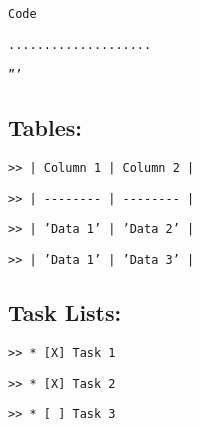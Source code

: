 \documentclass[12pt,british]{article}
\begin{document}
\noindent \texttt{\qquad{}Code }

\noindent \texttt{\qquad{}....................}

\noindent \texttt{\qquad{}'''}

\subsection{Tables:}

\noindent \texttt{>\textcompwordmark > | Column 1 | Column 2 |}

\noindent \texttt{>\textcompwordmark > | -{}-{}-{}-{}-{}-{}-{}- |
-{}-{}-{}-{}-{}-{}-{}- |}

\noindent \texttt{>\textcompwordmark > | 'Data 1' | 'Data 2' |}

\noindent \texttt{>\textcompwordmark > | 'Data 1' | 'Data 3' |}

\subsection{Task Lists:}

\noindent \texttt{>\textcompwordmark > {*} {[}X{]} Task 1}

\noindent \texttt{>\textcompwordmark > {*} {[}X{]} Task 2}

\noindent \texttt{>\textcompwordmark > {*} {[} {]} Task 3}
\end{document}
